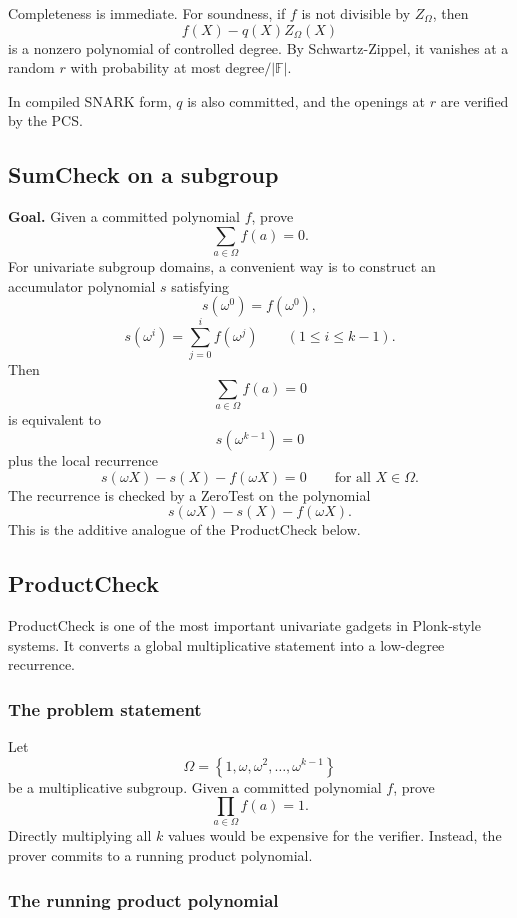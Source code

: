 \documentclass[11pt]{article}
\newcommand{\F}{\mathbb{F}}
\newcommand{\set}[1]{\left\{#1\right\}}
\begin{document}
Completeness is immediate. For soundness, if $f$ is not divisible by $Z_\Omega$, then
\[
    f(X)-q(X)Z_\Omega(X)
\]
is a nonzero polynomial of controlled degree. By Schwartz-Zippel, it vanishes at a random $r$ with probability at most degree$/|\F|$.

In compiled SNARK form, $q$ is also committed, and the openings at $r$ are verified by the PCS.

\subsection{SumCheck on a subgroup}

\textbf{Goal.} Given a committed polynomial $f$, prove
\[
    \sum_{a\in\Omega}f(a)=0.
\]
For univariate subgroup domains, a convenient way is to construct an accumulator polynomial $s$ satisfying
\[
    s(\omega^0)=f(\omega^0),
\]
\[
    s(\omega^i)=\sum_{j=0}^{i} f(\omega^j)
    \qquad (1\le i\le k-1).
\]
Then
\[
    \sum_{a\in\Omega} f(a)=0
\]
is equivalent to
\[
    s(\omega^{k-1})=0
\]
plus the local recurrence
\[
    s(\omega X)-s(X)-f(\omega X)=0
    \qquad\text{for all }X\in\Omega.
\]
The recurrence is checked by a ZeroTest on the polynomial
\[
    s(\omega X)-s(X)-f(\omega X).
\]
This is the additive analogue of the ProductCheck below.

\subsection{ProductCheck}

ProductCheck is one of the most important univariate gadgets in Plonk-style systems. It converts a global multiplicative statement into a low-degree recurrence.

\subsubsection*{The problem statement}

Let
\[
    \Omega=\set{1,\omega,\omega^2,\ldots,\omega^{k-1}}
\]
be a multiplicative subgroup. Given a committed polynomial $f$, prove
\[
    \prod_{a\in\Omega} f(a)=1.
\]
Directly multiplying all $k$ values would be expensive for the verifier. Instead, the prover commits to a running product polynomial.

\subsubsection*{The running product polynomial}
\end{document}
